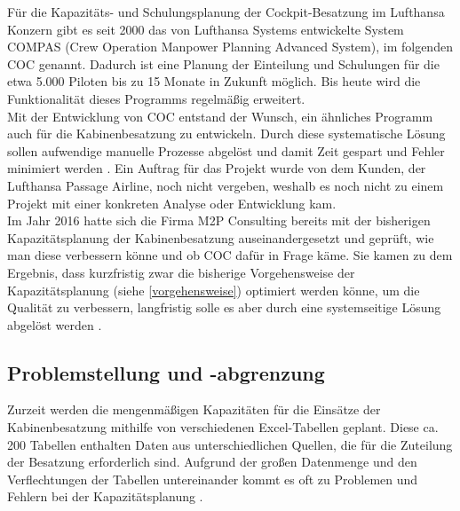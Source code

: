 \documentclass [12pt, a4paper, oneside, titlepage, ngerman]{article}
\begin{document}
\noindent Für die Kapazitäts- und Schulungsplanung der Cockpit-Besatzung im Lufthansa Konzern gibt es seit 2000 das von Lufthansa Systems entwickelte System COMPAS (Crew Operation Manpower Planning Advanced System), im folgenden \ac{COC} genannt. Dadurch ist eine Planung der Einteilung und Schulungen für die etwa 5.000 Piloten bis zu 15 Monate in Zukunft möglich. Bis heute wird die Funktionalität dieses Programms regelmäßig erweitert.  \\
Mit der Entwicklung von \ac{COC} entstand der Wunsch, ein ähnliches Programm auch für die Kabinenbesatzung zu entwickeln. Durch diese systematische Lösung sollen aufwendige manuelle Prozesse abgelöst und damit Zeit gespart und Fehler minimiert werden \cite[vgl.][S.4]{highlevelitems}. Ein Auftrag für das Projekt wurde von dem Kunden, der Lufthansa Passage Airline, noch nicht vergeben, weshalb es noch nicht zu einem Projekt mit einer konkreten Analyse oder Entwicklung kam.  \\

\noindent Im Jahr 2016 hatte sich die Firma M2P Consulting bereits mit der bisherigen Kapazitätsplanung der Kabinenbesatzung auseinandergesetzt und geprüft, wie man diese verbessern könne und ob \ac{COC} dafür in Frage käme. Sie kamen zu dem Ergebnis, dass kurzfristig zwar die bisherige Vorgehensweise der Kapazitätsplanung (siehe \ref{vorgehensweise}) optimiert werden könne, um die Qualität zu verbessern, langfristig solle es aber durch eine systemseitige Lösung abgelöst werden \cite [vgl.][S.8-10]{M2P}. %

\subsection {Problemstellung und -abgrenzung}
Zurzeit werden die mengenmäßigen Kapazitäten für die Einsätze der Kabinenbesatzung mithilfe von verschiedenen Excel-Tabellen geplant. Diese ca. 200 Tabellen enthalten Daten aus unterschiedlichen Quellen, die für die Zuteilung der Besatzung erforderlich sind. Aufgrund der großen Datenmenge und den Verflechtungen der Tabellen untereinander kommt es oft zu Problemen und Fehlern bei der Kapazitätsplanung \cite[vgl.][]{Gespraech2}. \\ 
\end{document}
